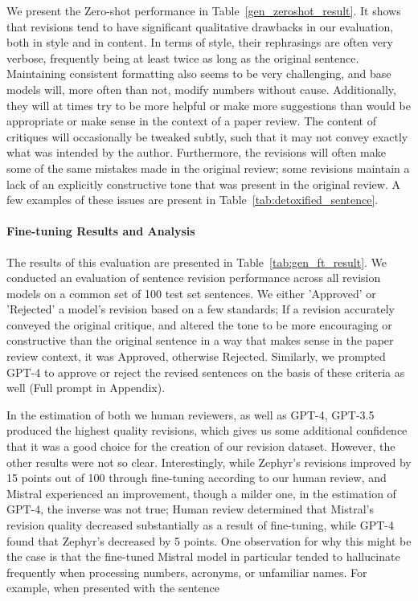 We present the Zero-shot performance in Table~\ref{gen_zeroshot_result}. It shows that revisions tend to have significant qualitative drawbacks in our evaluation, both in style and in content. In terms of style, their rephrasings are often very verbose, frequently being at least twice as long as the original sentence. Maintaining consistent formatting also seems to be very challenging, and base models will, more often than not, modify numbers without cause. Additionally, they will at times try to be more helpful or make more suggestions than would be appropriate or make sense in the context of a paper review. The content of critiques will occasionally be tweaked subtly, such that it may not convey exactly what was intended by the author. Furthermore, the revisions will often make some of the same mistakes made in the original review; some revisions maintain a lack of an explicitly constructive tone that was present in the original review. A few examples of these issues are present in Table~\ref{tab:detoxified_sentence}.



\paragraph{Fine-tuning Results and Analysis}

The results of this evaluation are presented in Table~\ref{tab:gen_ft_result}. We conducted an evaluation of sentence revision performance across all revision models on a common set of 100 test set sentences. We either 'Approved' or 'Rejected' a model's revision based on a few standards; If a revision accurately conveyed the original critique, and altered the tone to be more encouraging or constructive than the original sentence in a way that makes sense in the paper review context, it was Approved, otherwise Rejected. Similarly, we prompted GPT-4 to approve or reject the revised sentences on the basis of these criteria as well (Full prompt in Appendix).



In the estimation of both we human reviewers, as well as GPT-4, GPT-3.5 produced the highest quality revisions, which gives us some additional confidence that it was a good choice for the creation of our revision dataset. However, the other results were not so clear. Interestingly, while Zephyr's revisions improved by 15 points out of 100 through fine-tuning according to our human review, and Mistral experienced an improvement, though a milder one, in the estimation of GPT-4, the inverse was not true; Human review determined that Mistral's revision quality decreased substantially as a result of fine-tuning, while GPT-4 found that Zephyr's decreased by 5 points. One observation for why this might be the case is that the fine-tuned Mistral model in particular tended to hallucinate frequently when processing numbers, acronyms, or unfamiliar names. For example, when presented with the sentence

